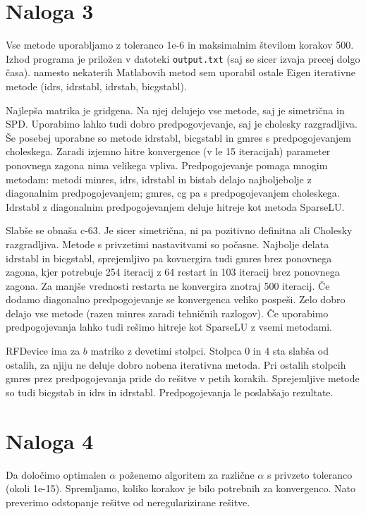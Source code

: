 \documentclass{article}
\begin{document}

    \section{Naloga 3}
    Vse metode uporabljamo z toleranco 1e-6 in maksimalnim številom korakov 500. Izhod programa je priložen v datoteki \verb|output.txt| (saj se sicer izvaja precej dolgo časa). namesto nekaterih Matlabovih metod sem uporabil ostale Eigen iterativne metode (idrs, idrstabl, idrstab, bicgstabl).
    
    Najlepša matrika je gridgena. Na njej delujejo vse metode, saj je simetrična in SPD. Uporabimo lahko tudi dobro predpogovjevanje, saj je cholesky razgradljiva. Še posebej uporabne so metode idrstabl, bicgstabl in gmres s predpogojevanjem choleskega. Zaradi izjemno hitre konvergence (v le 15 iteracijah) parameter ponovnega zagona nima velikega vpliva. Predpogojevanje pomaga mnogim metodam: metodi minres, idrs, idrstabl in bistab delajo najboljebolje z diagonalnim predpogojevanjem; gmres, cg pa s predpogojevanjem choleskega. Idrstabl z diagonalnim predpogojevanjem deluje hitreje kot metoda SparseLU.

    Slabše se obnaša c-63. Je sicer simetrična, ni pa pozitivno definitna ali Cholesky razgradljiva. Metode s privzetimi nastavitvami so počasne. Najbolje delata idrstabl in bicgstabl, sprejemljivo pa kovnergira tudi gmres brez ponovnega zagona, kjer potrebuje 254 iteracij z 64 restart in 103 iteracij brez ponovnega zagona. Za manjše vrednosti restarta ne konvergira znotraj 500 iteracij. Če dodamo diagonalno predpogojevanje se konvergenca veliko pospeši. Zelo dobro delajo vse metode (razen minres zaradi tehničnih razlogov). Če uporabimo predpogojevanja lahko tudi rešimo hitreje kot SparseLU z vsemi metodami.

    RFDevice ima za \(b\) matriko z devetimi stolpci. Stolpca \(0\) in \(4\) sta slabša od ostalih, za njiju ne deluje dobro nobena iterativna metoda. Pri ostalih stolpcih gmres prez predpogojevanja pride do rešitve v petih korakih. Sprejemljive metode so tudi bicgstab in idrs in idrstabl. Predpogojevanja le poslabšajo rezultate.




    \section{Naloga 4}
    Da določimo optimalen \(\alpha\) poženemo algoritem za različne \(\alpha\) s privzeto toleranco (okoli 1e-15). Spremljamo, koliko korakov je bilo potrebnih za konvergenco. Nato preverimo odstopanje rešitve od neregularizirane rešitve.
\end{document}
